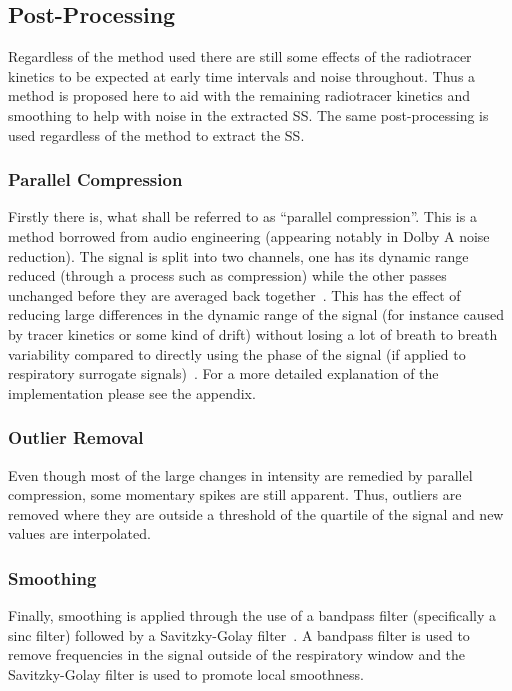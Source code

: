     \subsection{Post-Processing} \label{sec:post_processing}
        Regardless of the method used there are still some effects of the radiotracer kinetics to be expected at early time intervals and noise throughout. Thus a method is proposed here to aid with the remaining radiotracer kinetics and smoothing to help with noise in the extracted \gls{SS}. The same post-processing is used regardless of the method to extract the \gls{SS}.
            
        \subsubsection{Parallel Compression} \label{sec:parallel_compression}   
            Firstly there is, what shall be referred to as ``parallel compression''. This is a method borrowed from audio engineering (appearing notably in Dolby A noise reduction). The signal is split into two channels, one has its dynamic range reduced (through a process such as compression) while the other passes unchanged before they are averaged back together~\parencite{Izhaki2012MixingTools}. This has the effect of reducing large differences in the dynamic range of the signal (for instance caused by tracer kinetics or some kind of drift) without losing a lot of breath to breath variability compared to directly using the phase of the signal (if applied to respiratory surrogate signals)~\parencite{Lamare2022PETVadis}. For a more detailed explanation of the implementation please see the appendix.

        \subsubsection{Outlier Removal} \label{sec:outlier_removal}
            Even though most of the large changes in intensity are remedied by parallel compression, some momentary spikes are still apparent. Thus, outliers are removed where they are outside a threshold of the quartile of the signal and new values are interpolated.

        \subsubsection{Smoothing} \label{sec:smoothing}
            Finally, smoothing is applied through the use of a bandpass filter (specifically a sinc filter) followed by a Savitzky-Golay filter~\parencite{Savitzky1964SmoothingProcedures}. A bandpass filter is used to remove frequencies in the signal outside of the respiratory window and the Savitzky-Golay filter is used to promote local smoothness.

